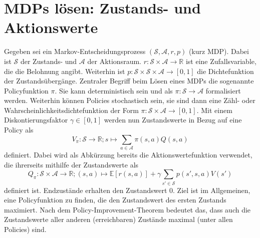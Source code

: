 \section{MDPs lösen: Zustands- und Aktionswerte}
\label{section:mdp_fundamentals}
Gegeben sei ein Markov-Entscheidungsprozess $(\mathcal{S}, \mathcal{A}, r, p)$ (kurz MDP).
Dabei ist $\mathcal{S}$ der Zustands- und $\mathcal{A}$ der Aktionsraum.
$r: \mathcal{S} \times \mathcal{A} \rightarrow \mathbb{R}$ ist eine Zufallsvariable, die die Belohnung angibt.
Weiterhin ist $p: \mathcal{S} \times \mathcal{S} \times \mathcal{A} \rightarrow [0,1]$ die Dichtefunktion der Zustandsübergänge.
Zentraler Begriff beim Lösen eines MDPs die sogenannte Policyfunktion $\pi$.
Sie kann deterministisch sein und als $\pi: \mathcal{S} \rightarrow \mathcal{A}$ formalisiert werden.
Weiterhin können Policies stochastisch sein, sie sind dann eine Zähl- oder Wahrscheinlichkeitsdichtefunktion der Form $\pi: \mathcal{S}\times\mathcal{A}\rightarrow [0, 1]$.
Mit einem Diskontierungsfaktor $\gamma \in [0,1]$ werden nun Zustandswerte in Bezug auf eine Policy als
\begin{equation}
    V_\pi: \mathcal{S} \rightarrow \mathbb{R}; s \mapsto \sum_{a\in\mathcal{A}}\pi(s, a) Q(s, a)
\end{equation}
definiert.
Dabei wird als Abkürzung bereits die Aktionswertefunktion verwendet, die ihrerseits mithilfe der Zustandswerte als
\begin{equation}
    Q_\pi: \mathcal{S} \times \mathcal{A} \rightarrow \mathbb{R}; (s, a) \mapsto \mathbb{E}\left[r(s,a)\right]+\gamma \sum_{s'\in\mathcal{S}}{p\left(s', s, a\right) V\left(s'\right)}
\end{equation}
definiert ist.
Endzustände erhalten den Zustandswert 0.
Ziel ist im Allgemeinen, eine Policyfunktion zu finden, die den Zustandswert des ersten Zustands maximiert.
Nach dem Policy-Improvement-Theorem bedeutet das, dass auch die Zustandswerte aller anderen (erreichbaren) Zustände maximal (unter allen Policies) sind.

